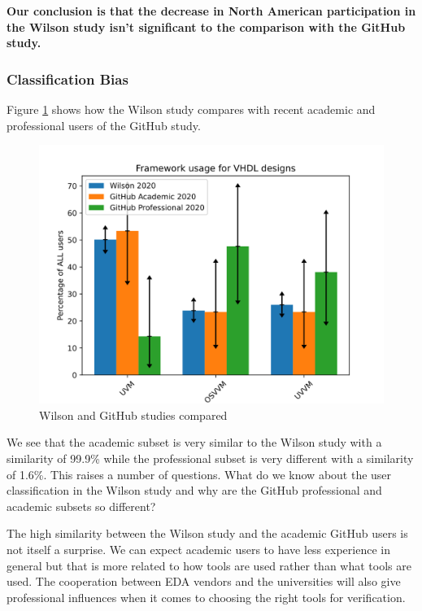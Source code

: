 \documentclass[]{article}
\begin{document}
\textbf{Our conclusion is that the decrease in North American participation in the Wilson study isn't significant to the comparison with the GitHub study.}

\hypertarget{classification-bias}{%
\subsubsection{Classification Bias}\label{classification-bias}}

Figure \ref{fig:github-academic-and-professional-comparison-2020} shows how the Wilson study compares with recent academic and professional users of the GitHub study.

\begin{figure}

{\centering \includegraphics[width=0.85\linewidth]{img/github_academic_and_professional_comparison_2020} 

}

\caption{Wilson and GitHub studies compared}\label{fig:github-academic-and-professional-comparison-2020}
\end{figure}

We see that the academic subset is very similar to the Wilson study with a similarity of 99.9\% while the professional subset is very different with a similarity of 1.6\%. This raises a number of questions. What do we know about the user classification in the Wilson study and why are the GitHub professional and academic subsets so different?

The high similarity between the Wilson study and the academic GitHub users is not itself a surprise. We can expect academic users to have less experience in general but that is more related to how tools are used rather than what tools are used. The cooperation between EDA vendors and the universities will also give professional influences when it comes to choosing the right tools for verification.
\end{document}
